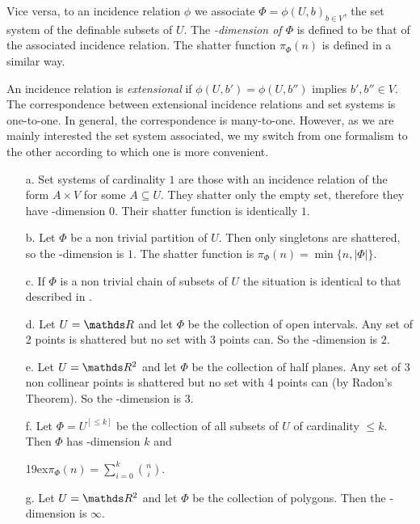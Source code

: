 \documentclass[sputnik.tex]{subfiles}
\begin{document}
Vice versa, to an incidence relation $\phi$ we associate $\Phi=\phi(U,b)_{b\in V}$, the set system of the definable subsets of $U$.
The \emph{\vc-dimension of $\Phi$} is defined to be that of the associated incidence relation.
The shatter function \emph{$\pi_\Phi(n)$\/} is defined in a similar way.

An incidence relation is \emph{extensional\/} if $\phi(U,b')=\phi(U,b'')$ implies $b',b''\in V$.
The correspondence between extensional incidence relations and set systems is one-to-one.
In general, the correspondence is many-to-one.
However, as we are mainly interested the set system associated, we my switch from one formalism to the other according to which one is more convenient.


\begin{example}\label{ex_vcdim}
\begin{itemize}
\item[a.] Set systems of cardinality $1$ are those with an incidence relation of the form $A\times V$ for some $A\subseteq U$.
They shatter only the empty set, therefore they have \vc-dimension $0$.
Their shatter function is identically $1$.
\item[b.] Let $\Phi$ be a non trivial partition of $U$.
Then only singletons are shattered, so the \vc-dimension is $1$.
The shatter function is $\pi_\Phi(n)=\min\big\{n,|\Phi|\big\}$.
\item[c.] If $\Phi$ is a non trivial chain of subsets of $U$ the situation is identical to that described in .
\item[d.] Let $U=\RR$ and let $\Phi$ be the collection of open intervals.
Any set of 2 points is shattered but no set with 3 points can.
So the \vc-dimension is $2$.
\item[e.] Let $U=\RR^2$ and let $\Phi$ be the collection of half planes.
Any set of 3 non collinear points is shattered but no set with 4 points can (by Radon's Theorem).
So the \vc-dimension is $3$.
\item[f.] Let $\Phi=U^{[\le k]}$ be the collection of all subsets of $U$ of cardinality $\le k$.
Then $\Phi$ has \vc-dimension $k$ and

\noindent\kern19ex$\displaystyle\pi_\Phi(n)=\sum^k_{i=0} \binom{n}{i}$.

\item[g.] Let $U=\RR^2$ and let $\Phi$ be the collection of polygons.
Then the \vc-dimension is $\infty$.\QED
\end{itemize}
\end{example}
\end{document}
